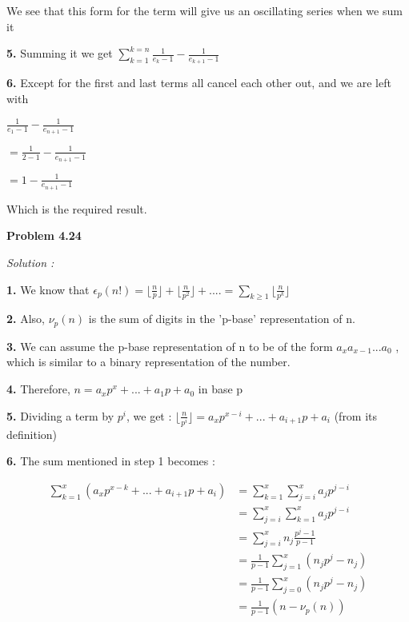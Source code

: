 \documentclass[12pt]{article}
\begin{document}
We see that this form for the term will give us an oscillating series when we sum it

{\bf 5. } Summing it we get $\sum_{k=1}^{k=n} {{\frac{1}{e_{k} -1}} - {\frac{1}{e_{k+1} - 1}}}$

{\bf 6. } Except for the first and last terms all cancel each other out, and we are left with

${\frac{1}{e_1-1}} - {\frac{1}{e_{n+1}-1}}$

$= {\frac{1}{2-1}} - {\frac{1}{e_{n+1}-1}}$

$= {1} - {\frac{1}{e_{n+1}-1}}$

Which is the required result.

\medskip
\medskip

\noindent
{\bf Problem 4.24}

\textit {Solution :}

{\bf 1. } We know that $\epsilon_p(n!) = {\lfloor \frac{n}{p} \rfloor} + {\lfloor \frac{n}{p^2} \rfloor} + .... = \sum_{k\geq 1}^{} \lfloor \frac{n}{p^k} \rfloor$

{\bf 2. } Also, $\nu_p(n)$ is the sum of digits in the 'p-base' representation of n.

{\bf 3. } We can assume the p-base representation of n to be of the form $a_xa_{x-1}...a_0$ , which is similar to a binary representation of the number.

{\bf 4. } Therefore, $n = a_xp^x+...+a_1p+a_0$ in base p

{\bf 5. } Dividing a term by $p^i$, we get : ${\lfloor \frac{n}{p^i} \rfloor} = {a_xp^{x-i}} + ...+a_{i+1}p + a_i$ (from its definition) 

{\bf 6. } The sum mentioned in step 1 becomes : 

\begin{equation}\label{eq4}
  \begin{split}
     \sum_{k=1}^{x} ({a_xp^{x-k}} + ...+ a_{i+1}p + a_i) & = \sum_{k=1}^{x} \sum_{j=i}^{x} a_jp^{j-i}\\
     & = \sum_{j=i}^{x}\sum_{k=1}^{x} a_jp^{j-i} \\
     & = \sum_{j=i}^{x} n_j \frac{p^j-1}{p-1}\\
     & = \frac{1}{p-1} {\sum_{j=1}^{x} (n_jp^j - n_j)}\\
     & = \frac{1}{p-1} {\sum_{j=0}^{x} (n_jp^j - n_j)}\\
     & = \frac{1}{p-1} (n-\nu_p(n))          
  \end{split}
\end{equation}
\end{document}
